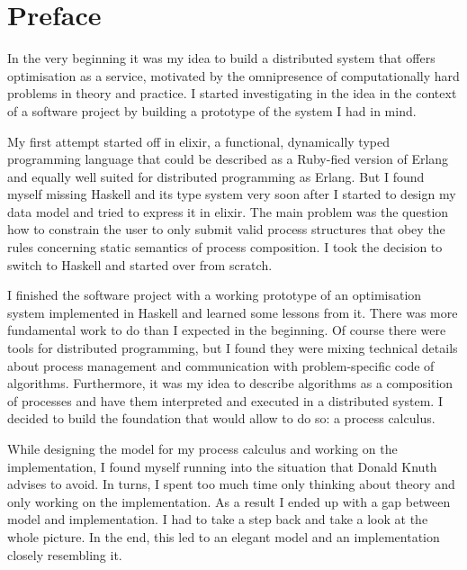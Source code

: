 $\;$
\clearpage
\renewcommand*{\dictumwidth}{.6\textwidth}

\section*{Preface}
In the very beginning it was my idea to build a distributed system that offers optimisation as a service, motivated by the omnipresence of computationally hard problems in theory and practice. I started investigating in the idea in the context of a software project by building a prototype of the system I had in mind.

My first attempt started off in \textsf{elixir}, a functional, dynamically typed programming language that could be described as a \textsf{Ruby}-fied version of \textsf{Erlang} and equally well suited for distributed programming as \textsf{Erlang}. But I found myself missing \textsf{Haskell} and its type system very soon after I started to design my data model and tried to express it in \textsf{elixir}. The main problem was the question how to constrain the user to only submit valid process structures that obey the rules concerning static semantics of process composition. I took the decision to switch to \textsf{Haskell} and started over from scratch.

I finished the software project with a working prototype of an optimisation system implemented in \textsf{Haskell} and learned some lessons from it. There was more fundamental work to do than I expected in the beginning. Of course there were tools for distributed programming, but I found they were mixing technical details about process management and communication with problem-specific code of algorithms. Furthermore, it was my idea to describe algorithms as a composition of processes and have them interpreted and executed in a distributed system. I decided to build the foundation that would allow to do so: a process calculus.

While designing the model for my process calculus and working on the implementation, I found myself running into the situation that Donald Knuth advises to avoid. In turns, I spent too much time only thinking about theory and only working on the implementation. As a result I ended up with a gap between model and implementation. I had to take a step back and take a look at the whole picture. In the end, this led to an elegant model and an implementation closely resembling it.

